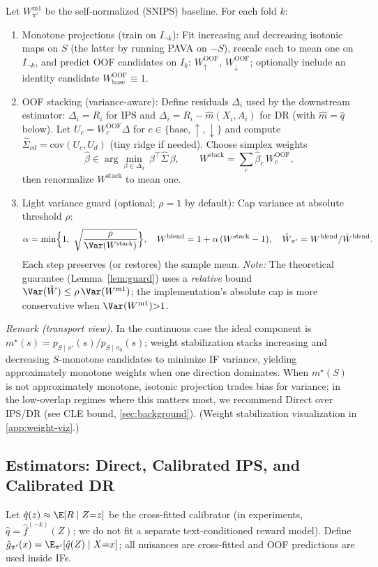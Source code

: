 Let $W_{\pi'}^{\mathrm{m1}}$ be the self-normalized (SNIPS) baseline. For each fold $k$:
\begin{enumerate}[leftmargin=*,itemsep=2pt,topsep=2pt]
\item Monotone projections (train on $I_{\neg k}$): Fit increasing and decreasing isotonic maps on $S$
(the latter by running PAVA on $-S$), rescale each to mean one on $I_{\neg k}$, and predict OOF candidates on $I_k$:
$W_{\uparrow}^{\mathrm{OOF}}$, $W_{\downarrow}^{\mathrm{OOF}}$; optionally include an identity candidate
$W_{\mathrm{base}}^{\mathrm{OOF}}\equiv 1$.
\item OOF stacking (variance-aware): Define residuals $\Delta_i$ used by the downstream estimator:
$\Delta_i{=}R_i$ for IPS and $\Delta_i{=}R_i-\hat m(X_i,A_i)$ for DR (with $\hat m{=}\hat q$ below). Let
$U_c=W_c^{\mathrm{OOF}}\Delta$ for $c\in\{\mathrm{base},\uparrow,\downarrow\}$ and compute
$\hat\Sigma_{cd}=\mathrm{cov}(U_c,U_d)$ (tiny ridge if needed). Choose simplex weights
\[
\hat\beta\in\arg\min_{\beta\in\Delta_3}\ \beta^\top\hat\Sigma\,\beta,\qquad
W^{\mathrm{stack}}=\sum_c \hat\beta_c\,W_c^{\mathrm{OOF}},
\]
then renormalize $W^{\mathrm{stack}}$ to mean one.
\item Light variance guard (optional; $\rho{=}1$ by default): Cap variance at absolute threshold $\rho$:
\[
\alpha=\min\!\Big\{1,\ \sqrt{\frac{\rho}{\Var(W^{\mathrm{stack}})}}\Big\},\quad
W^{\mathrm{blend}}=1+\alpha\,(W^{\mathrm{stack}}-1),\quad
\hat W_{\pi'}=W^{\mathrm{blend}}/\bar W^{\mathrm{blend}}.
\]
Each step preserves (or restores) the sample mean. \emph{Note:} The theoretical guarantee (Lemma~\ref{lem:guard}) uses a \emph{relative} bound $\Var(\hat W)\le\rho\,\Var(W^{\mathrm{m1}})$; the implementation's absolute cap is more conservative when $\Var(W^{\mathrm{m1}}){>}1$.
\end{enumerate}
\emph{Remark (transport view).} In the continuous case the ideal component is
$m^\star(s)=p_{S\mid\pi'}(s)/p_{S\mid\pi_0}(s)$; weight stabilization stacks increasing and decreasing $S$-monotone candidates to minimize IF variance, yielding approximately monotone weights when one direction dominates.
When $m^\star(S)$ is not approximately monotone, isotonic projection trades bias for variance; in the low-overlap regimes where this matters most, we recommend Direct over IPS/DR (see CLE bound, \cref{sec:background}).
(Weight stabilization visualization in \cref{app:weight-viz}.)

\subsection{Estimators: Direct, Calibrated IPS, and Calibrated DR}
\label{ssec:method-estimators}
Let $\hat q(z)\approx \E[R\mid Z{=}z]$ be the cross-fitted calibrator (in experiments, $\hat q = \hat f^{(-k)}(Z)$; we do not fit a separate text-conditioned reward model).
Define $\hat g_{\pi'}(x)=\E_{\pi'}[\hat q(Z)\mid X{=}x]$; all nuisances are cross-fitted and OOF predictions
are used inside IFs.

